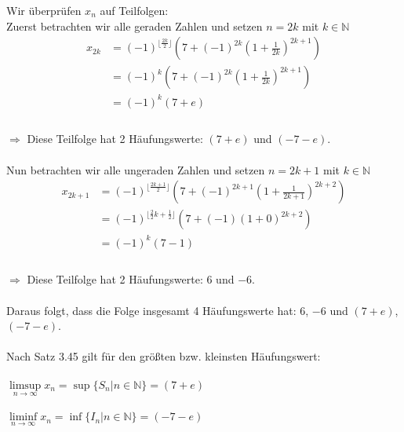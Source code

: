 \begin{lsg}
Wir \"uberpr\"ufen $x_n$ auf Teilfolgen:\\
Zuerst betrachten wir alle geraden Zahlen und setzen $n=2k$ mit $k\in \mathbb{N}$\\

\begin{equation}
\begin{aligned}
    x_{2k} &= (-1)^{\lfloor \frac{2k}{2}\rfloor} \left(7+(-1)^{2k}\left(1+\frac{1}{2k}\right)^{2k+1} \right)\\
    &= (-1)^k \left(7+(-1)^{2k}\left(1+\frac{1}{2k}\right)^{2k+1} \right)\\
    &= (-1)^k \left(7+e \right)\\
\end{aligned}
\end{equation}
\\
$\Rightarrow$ Diese Teilfolge hat 2 H\"aufungswerte: $(7+e)$ und $(-7-e)$.\\
\\
Nun betrachten wir alle ungeraden Zahlen und setzen $n=2k+1$ mit $k\in \mathbb{N}$\\
\begin{equation}
\begin{aligned}
    x_{2k+1} &= (-1)^{\lfloor \frac{2k+1}{2}\rfloor} \left(7+(-1)^{2k+1}\left(1+\frac{1}{2k+1}\right)^{2k+2} \right)\\
    &= (-1)^{\lfloor \frac{2}{2}k+\frac{1}{2}\rfloor} \left(7+(-1)\left(1+0\right)^{2k+2} \right)\\
    &= (-1)^k \left(7-1 \right)\\
\end{aligned}
\end{equation}
\\
$\Rightarrow$ Diese Teilfolge hat 2 H\"aufungswerte: $6$ und $-6$.\\
\\
Daraus folgt, dass die Folge insgesamt 4 H\"aufungswerte hat: $6$, $-6$ und $(7+e)$, $(-7-e)$.\\
\\
Nach Satz 3.45 gilt für den gr\"o{\ss}ten bzw. kleinsten H\"aufungswert:\\
\\
$\limsup\limits_{n \to \infty} x_n = \sup\{S_n|n\in\mathbb{N}\}=(7+e)$\\
\\
$\liminf\limits_{n \to \infty} x_n = \inf\{I_n|n\in\mathbb{N}\}=(-7-e)$
\end{lsg}


